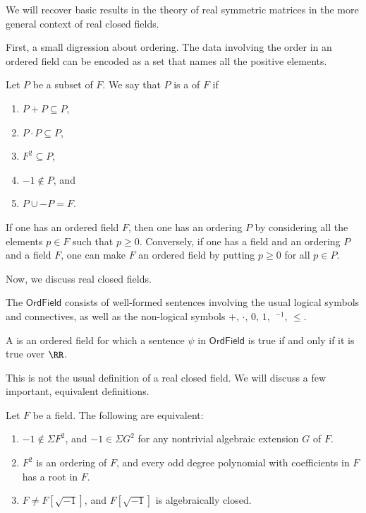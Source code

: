 \documentclass{article}
\newcommand*\OrdField{\mathsf{OrdField}}
\begin{document}
We will recover basic results in the theory of real symmetric matrices in the more general context of real closed fields.

First, a small digression about ordering.
The data involving the order in an ordered field can be encoded as a set that names all the positive elements.

\begin{definition}
    Let $P$ be a subset of $F$.
    We say that $P$ is a  of $F$ if
    \begin{enumerate}[label=(\alph*)]
        \item 
            $P + P \subseteq P$,
        \item 
            $P \cdot P \subseteq P$,
        \item 
            $F^2 \subseteq P$,
        \item
            $-1 \notin P$, and
        \item 
            $P \cup -P = F$.
    \end{enumerate}
\end{definition}

If one has an ordered field $F$, then one has an ordering $P$ by considering all the elements $p \in F$ such that $p \geq 0$.
Conversely, if one has a field and an ordering $P$ and a field $F$, one can make $F$ an ordered field by putting $p \geq 0$ for all $p \in P$.

Now, we discuss real closed fields.

\begin{definition}
The  $\OrdField$ consists of well-formed sentences involving the usual logical symbols and connectives, as well as the non-logical symbols $+$, $\cdot$, $0$, $1$, $\ ^{-1}$, $\leq$.

    A  is an ordered field for which a sentence $\psi$ in $\OrdField$ is true if and only if it is true over $\RR$.
\end{definition}

This is not the usual definition of a real closed field.
We will discuss a few important, equivalent definitions.

\begin{theorem}
    \label{thm:ArtinSchreier1926}
    Let $F$ be a field.
    The following are equivalent:
    \begin{enumerate}[label=(\roman*)]
        \item 
            $-1 \notin \Sigma F^2$, and $-1 \in \Sigma G^2$ for any nontrivial algebraic extension $G$ of $F$.
        \item 
            $F^2$ is an ordering of $F$, and every odd degree polynomial with coefficients in $F$ has a root in $F$.
        \item 
            $F \neq F[\sqrt{-1}]$, and $F[\sqrt{-1}]$ is algebraically closed.
    \end{enumerate}
\end{theorem}
\end{document}
